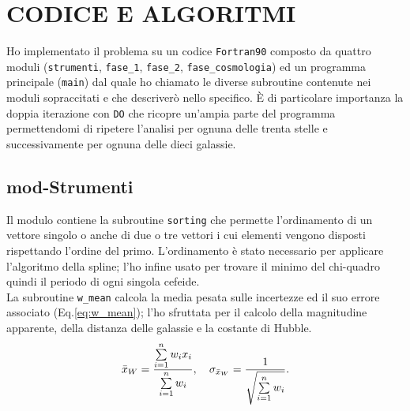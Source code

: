 \documentclass{article}
\numberwithin{equation}{subsection}
\begin{document}
\section{CODICE E ALGORITMI}
\vspace{0.1 cm}
Ho implementato il problema su un codice \texttt{Fortran90} composto da quattro moduli (\texttt{strumenti}, \texttt{fase\_1}, \texttt{fase\_2}, \texttt{fase\_cosmologia}) ed un programma principale (\texttt{main}) dal quale ho chiamato le diverse subroutine contenute nei moduli sopraccitati e che descriverò nello specifico. \`E di particolare importanza la doppia iterazione con \texttt{DO} che ricopre un'ampia parte del programma permettendomi di ripetere l'analisi per ognuna delle trenta stelle e successivamente per ognuna delle dieci galassie.
\subsection{mod-Strumenti}
\vspace{0.2 cm}
Il modulo contiene la subroutine \texttt{sorting} che permette l'ordinamento di un vettore singolo o anche di due o tre vettori i cui elementi vengono disposti rispettando l'ordine del primo. L'ordinamento è stato necessario per applicare l'algoritmo della spline; l'ho infine usato per trovare il minimo del chi-quadro quindi il periodo di ogni singola cefeide. \\
La subroutine \texttt{w\_mean} calcola la media pesata  sulle incertezze ed il suo errore associato (Eq.\ref{eq:w_mean}); l'ho sfruttata per il calcolo della magnitudine apparente, della distanza delle galassie e la costante di Hubble.
\begin{equation} \label{eq:w_mean}
    \Bar{x}_W=\frac{\sum\limits_{i=1}^{n}w_ix_i}{\sum\limits_{i=1}^{n}w_i}, \ \ \ 
    \sigma_{\Bar{x}_W}=\frac{1}{\sqrt{\sum\limits_{i=1}^{n}w_i}}.
\end{equation}
\end{document}
